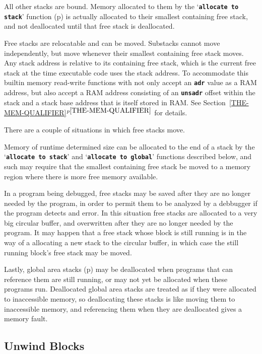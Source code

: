 \documentclass[12pt]{article}
\newcommand{\TT}[1]{{\tt \bfseries #1}}
\newcommand{\itemref}[1]{\ref{#1}$^{p\pageref{#1}}$}
\newcommand{\pagref}[1]{p\pageref{#1}}
\begin{document}
All other stacks are bound.  Memory allocated to them
by the `\TT{allocate to stack}' function (\pagref{ALLOCATE-TO-STACK})
is actually
allocated to their smallest containing free stack, and not deallocated
until that free stack is deallocated.

Free stacks are relocatable and can be moved.
Substacks cannot move independently,
but move whenever their smallest containing free stack moves.
Any stack address is relative to its containing free stack,
which is the current free stack at the time executable code uses
the stack address.  To accommodate this builtin memory read-write
functions with not only accept an \TT{adr} value as a RAM address,
but also accept a RAM address consisting of an \TT{unsadr}
offset within the stack and a stack base address that is itself
stored in RAM.  See Section~\itemref{THE-MEM-QUALIFIER} for details.

There are a couple of situations in which free stacks move.

Memory of runtime determined size can be allocated to the end of
a stack by the `\TT{allocate to stack}' and `\TT{allocate to global}'
functions described below, and such may
require that the smallest containing free stack
be moved to a memory region where there is more free memory available.

In a program being debugged, free stacks may be saved after they are no
longer needed by the program, in order to permit them to be analyzed
by a debbugger if the program detects and error.  In this situation
free stacks are allocated to a very big circular buffer, and overwritten
after they are no longer needed by the program.  It may happen that
a free stack whose block is still running is in the way of a allocating
a new stack to the circular buffer, in which case the still running
block's free stack may be moved.

Lastly, global area stacks (\pagref{GLOBAL-AREAS})
may be deallocated when programs that
can reference them are still running, or may not yet be allocated
when these programs run.  Deallocated global area stacks are treated as if
they were allocated to inaccessible memory, so deallocating these stacks
is like moving them to inaccessible memory, and referencing
them when they are deallocated gives a memory fault.


\subsection{Unwind Blocks}
\label{UNWIND-BLOCKS}
\end{document}
